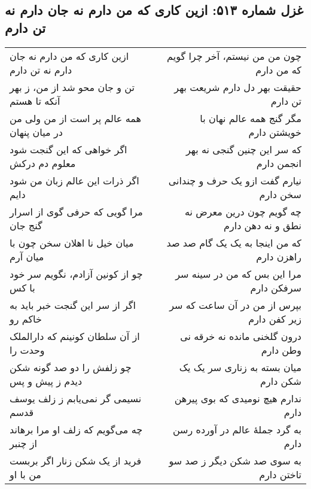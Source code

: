 \begin{center}
\section*{غزل شماره ۵۱۳: ازین کاری که من دارم نه جان دارم نه تن دارم}
\label{sec:513}
\begin{longtable}{l p{0.5cm} r}
ازین کاری که من دارم نه جان دارم نه تن دارم
&&
چون من من نیستم، آخر چرا گویم که من دارم
\\
تن و جان محو شد از من، ز بهر آنکه تا هستم
&&
حقیقت بهر دل دارم شریعت بهر تن دارم
\\
همه عالم پر است از من ولی من در میان پنهان
&&
مگر گنج همه عالم نهان با خویشتن دارم
\\
اگر خواهی که این گنجت شود معلوم دم درکش
&&
که سر این چنین گنجی نه بهر انجمن دارم
\\
اگر ذرات این عالم زبان من شود دایم
&&
نیارم گفت ازو یک حرف و چندانی سخن دارم
\\
مرا گویی که حرفی گوی از اسرار گنج جان
&&
چه گویم چون درین معرض نه نطق و نه دهن دارم
\\
میان خیل نا اهلان سخن چون با میان آرم
&&
که من اینجا به یک یک گام صد صد راهزن دارم
\\
چو از کونین آزادم، نگویم سر خود با کس
&&
مرا این بس که من در سینه سر سرفکن دارم
\\
اگر از سر این گنجت خبر باید به خاکم رو
&&
بپرس از من در آن ساعت که سر زیر کفن دارم
\\
از آن سلطان کونینم که دارالملک وحدت را
&&
درون گلخنی مانده نه خرقه نی وطن دارم
\\
چو زلفش را دو صد گونه شکن دیدم ز پیش و پس
&&
میان بسته به زناری سر یک یک شکن دارم
\\
نسیمی گر نمی‌یابم ز زلف یوسف قدسم
&&
ندارم هیچ نومیدی که بوی پیرهن دارم
\\
چه می‌گویم که زلف او مرا برهاند از چنبر
&&
به گرد جملهٔ عالم در آورده رسن دارم
\\
فرید از یک شکن زنار اگر بربست من با او
&&
به سوی صد شکن دیگر ز صد سو تاختن دارم
\\
\end{longtable}
\end{center}

